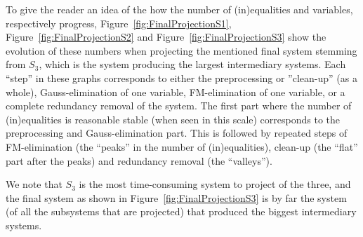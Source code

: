 To give the reader an idea of the how the number of (in)equalities and variables, respectively progress, Figure~\ref{fig:FinalProjectionS1}, Figure~\ref{fig:FinalProjectionS2} and Figure~\ref{fig:FinalProjectionS3} show the evolution of these numbers when projecting the mentioned final system stemming from $S_3$, which is the system producing the largest intermediary systems. Each ``step'' in these graphs corresponds to either the preprocessing or ''clean-up'' (as a whole), Gauss-elimination of one variable, FM-elimination of one variable, or a complete redundancy removal of the system. The first part where the number of (in)equalities is reasonable stable (when seen in this scale) corresponds to the preprocessing and Gauss-elimination part. 
This is followed by repeated steps of FM-elimination (the ``peaks'' in the number of (in)equalities), clean-up (the ``flat'' part after the peaks) and redundancy removal (the ``valleys'').

We note that $S_3$ is the most time-consuming system to project of the three, and the final system as shown in Figure~\ref{fig:FinalProjectionS3} is by far the system (of all the subsystems that are projected) that produced the biggest intermediary systems.  
